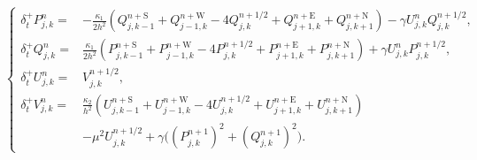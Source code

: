 \documentclass[fleqn,11pt]{elsarticle}
\numberwithin{equation}{section}
\begin{document}
\begin{equation}\label{dp-avf-kj}
	\left\{\begin{aligned}
		\delta_t^+P_{j,k}^n= & -\frac{\kappa_1}{2h^2}(Q_{j,k-1}^{n+\text{S}}+Q_{j-1, k}^{n+\text{W}} - 4 Q_{j,k}^{n+1/2}+ Q_{j+1, k}^{n+\text{E}} + Q_{j, k+1}^{n+\text{N}})-\gamma U_{j,k}^nQ_{j,k}^{n+1/2},                                             \\
		\delta_t^+Q_{j,k}^n= & \frac{\kappa_1}{2h^2}(P_{j,k-1}^{n+\text{S}}+P_{j-1, k}^{n+\text{W}} - 4 P_{j,k}^{n+1/2}+ P_{j+1, k}^{n+\text{E}} + P_{j, k+1}^{n+\text{N}})+\gamma U_{j,k}^nP_{j,k}^{n+1/2},                                              \\
		\delta_t^+U_{j,k}^n= & V_{j,k}^{n+1/2},                                                                                                                                                                                                           \\
		\delta_t^+V_{j,k}^n= & \frac{\kappa_2}{h^2}(U_{j,k-1}^{n+\text{S}}+U_{j-1, k}^{n+\text{W}} - 4 U_{j,k}^{n+1/2}+ U_{j+1, k}^{n+\text{E}} + U_{j, k+1}^{n+\text{N}})\\
		&-\mu^2 U_{j,k}^{n+1/2}+\gamma \big((P_{j,k}^{n+1})^2+(Q_{j,k}^{n+1})^2\big).
	\end{aligned}\right.
\end{equation}
\end{document}
